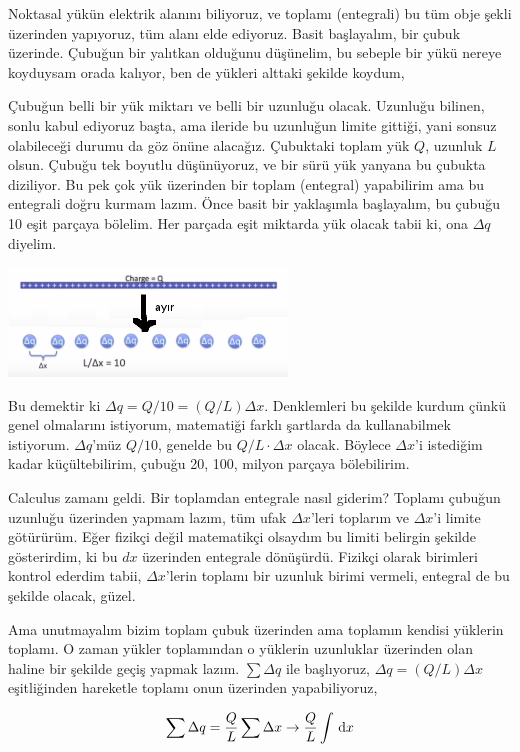 \documentclass[12pt,fleqn]{article}\usepackage{../../common}
\begin{document}
Noktasal yükün elektrik alanını biliyoruz, ve toplamı (entegrali) bu tüm
obje şekli üzerinden yapıyoruz, tüm alanı elde ediyoruz. Basit başlayalım,
bir çubuk üzerinde. Çubuğun bir yalıtkan olduğunu düşünelim, bu sebeple bir
yükü nereye koyduysam orada kalıyor, ben de yükleri alttaki şekilde koydum, 

Çubuğun belli bir yük miktarı ve belli bir uzunluğu olacak. Uzunluğu
bilinen, sonlu kabul ediyoruz başta, ama ileride bu uzunluğun limite
gittiği, yani sonsuz olabileceği durumu da göz önüne alacağız. Çubuktaki
toplam yük $Q$, uzunluk $L$ olsun. Çubuğu tek boyutlu düşünüyoruz, ve
bir sürü yük yanyana bu çubukta diziliyor. Bu pek çok yük üzerinden bir
toplam (entegral) yapabilirim ama bu entegrali doğru kurmam lazım. Önce
basit bir yaklaşımla başlayalım, bu çubuğu 10 eşit parçaya bölelim. Her
parçada eşit miktarda yük olacak tabii ki, ona $\Delta q$ diyelim. 

\includegraphics[width=20em]{05_02.png}

Bu demektir ki $\Delta q = Q/10 = (Q/L) \Delta x$. Denklemleri bu şekilde
kurdum çünkü genel olmalarını istiyorum, matematiği farklı şartlarda da
kullanabilmek istiyorum. $\Delta q$'müz $Q/10$, genelde bu $Q/L \cdot
\Delta x$ olacak. Böylece $\Delta x$'i istediğim kadar küçültebilirim,
çubuğu 20, 100, milyon parçaya bölebilirim. 

Calculus zamanı geldi. Bir toplamdan entegrale nasıl giderim? Toplamı
çubuğun uzunluğu üzerinden yapmam lazım, tüm ufak $\Delta x$'leri toplarım
ve $\Delta x$'i limite götürürüm. Eğer fizikçi değil matematikçi olsaydım
bu limiti belirgin şekilde gösterirdim, ki bu $dx$ üzerinden entegrale
dönüşürdü. Fizikçi olarak birimleri kontrol ederdim tabii, $\Delta x$'lerin
toplamı bir uzunluk birimi vermeli, entegral de bu şekilde olacak, güzel.

Ama unutmayalım bizim toplam çubuk üzerinden ama toplamın kendisi yüklerin
toplamı. O zaman yükler toplamından o yüklerin uzunluklar üzerinden olan
haline bir şekilde geçiş yapmak lazım. $\sum \Delta q$ ile başlıyoruz,
$\Delta q = (Q/L) \Delta x$ eşitliğinden hareketle toplamı onun üzerinden
yapabiliyoruz,

$$ \sum \Delta q = \frac{Q}{L} \sum \Delta x \to \frac{Q}{L} \int \,\mathrm{d} x $$
\end{document}
